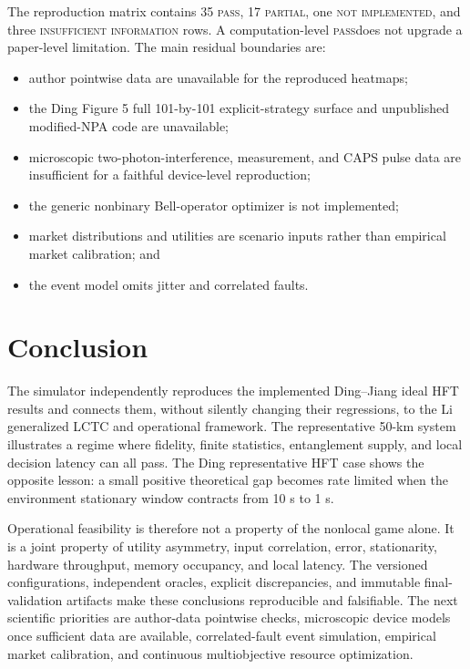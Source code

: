 \documentclass[10pt]{article}
\newcommand{\pass}{\textsc{pass}}
\newcommand{\partialstatus}{\textsc{partial}}
\begin{document}
The reproduction matrix contains 35 \pass, 17 \partialstatus, one
\textsc{not implemented}, and three
\textsc{insufficient information} rows.  A computation-level \pass does not
upgrade a paper-level limitation.  The main residual boundaries are:
\begin{itemize}
  \item author pointwise data are unavailable for the reproduced heatmaps;
  \item the Ding Figure 5 full 101-by-101 explicit-strategy surface and
        unpublished modified-NPA code are unavailable;
  \item microscopic two-photon-interference, measurement, and CAPS pulse data
        are insufficient for a faithful device-level reproduction;
  \item the generic nonbinary Bell-operator optimizer is not implemented;
  \item market distributions and utilities are scenario inputs rather than
        empirical market calibration; and
  \item the event model omits jitter and correlated faults.
\end{itemize}

\section{Conclusion}

The simulator independently reproduces the implemented Ding--Jiang ideal HFT
results and connects them, without silently changing their regressions, to the
Li generalized LCTC and operational framework.  The representative 50-km
system illustrates a regime where fidelity, finite statistics, entanglement
supply, and local decision latency can all pass.  The Ding representative HFT
case shows the opposite lesson: a small positive theoretical gap becomes rate
limited when the environment stationary window contracts from 10 s to 1 s.

Operational feasibility is therefore not a property of the nonlocal game
alone.  It is a joint property of utility asymmetry, input correlation, error,
stationarity, hardware throughput, memory occupancy, and local latency.  The
versioned configurations, independent oracles, explicit discrepancies, and
immutable final-validation artifacts make these conclusions reproducible and
falsifiable.  The next scientific priorities are author-data pointwise checks,
microscopic device models once sufficient data are available, correlated-fault
event simulation, empirical market calibration, and continuous multiobjective
resource optimization.
\end{document}
